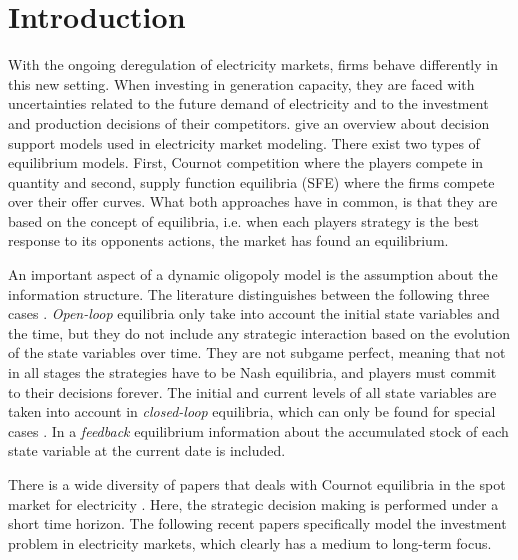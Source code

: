 \section{Introduction}

With the ongoing deregulation of electricity markets, firms behave differently in this new setting. When investing in generation capacity, they are faced with uncertainties related to the future demand of electricity and to the investment and production decisions of their competitors. \cite{Ventosa2005} give an overview about decision support models used in electricity market modeling. There exist two types of equilibrium models. First, Cournot competition where the players compete in quantity and second, supply function equilibria (SFE) where the firms compete over their offer curves. What both approaches have in common, is that they are based on the concept of \cite{Nash1951} equilibria, i.e. when each players strategy is the best response to its opponents actions, the market has found an equilibrium.

An important aspect of a dynamic oligopoly model is the assumption about the information structure. The literature distinguishes between the following three cases \citep[see, e.g.,][]{Cellini2004}. \emph{Open-loop} equilibria only take into account the initial state variables and the time, but they do not include any strategic interaction based on the evolution of the state variables over time. They are not subgame perfect, meaning that not in all stages the strategies have to be Nash equilibria, and players must commit to their decisions forever. The initial and current levels of all state variables are taken into account in \emph{closed-loop} equilibria, which can only be found for special cases \citep[see][]{Murphy2005}. In a \emph{feedback} equilibrium information about the accumulated stock of each state variable at the current date is included.

There is a wide diversity of papers that deals with Cournot equilibria in the spot market for electricity \citep[see, e.g.][]{Borenstein1999, Otero-Novas2000}. Here, the strategic decision making is performed under a short time horizon. The following recent papers specifically model the investment problem in electricity markets, which clearly has a medium to long-term focus.

